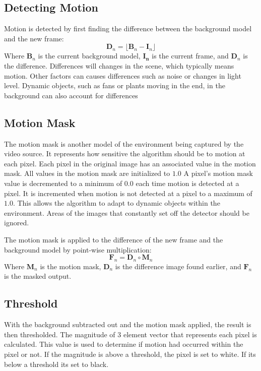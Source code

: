 \documentclass[journal]{IEEEtran}
\begin{document}
\subsection{Detecting Motion}
Motion is detected by first finding the difference between the background model and the new frame:
$$
\mathbf{D}_n = \lfloor\mathbf{B}_n - \mathbf{I}_n\rfloor
$$
Where $\mathbf{B}_n$ is the current background model, $\mathbf{I_n}$ is the current frame, and $\mathbf{D}_n$ 
is the difference. Differences will changes in the scene, which typically means motion. Other factors can causes 
differences such as noise or changes in light level. Dynamic objects, such as fans or plants moving in the end, 
in the background can also  account for differences

\subsection{Motion Mask}
The motion mask is another model of the environment being captured by the video source. It represents how
sensitive the algorithm should be to motion at each pixel. Each pixel in the original image has an associated 
value in the motion mask. All values in the motion mask are initialized to $1.0$ A pixel's motion mask
value is decremented to a minimum of $0.0$ each time motion is detected at a pixel. It is incremented when
motion is not detected at a pixel to a maximum of $1.0$. This allows the algorithm to adapt to dynamic
objects within the environment. Areas of the images that constantly set off the detector should be ignored.

The motion mask is applied to the difference of the new frame and the background model by point-wise multiplication:
$$
\mathbf{F}_n = \mathbf{D}_n \circ \mathbf{M}_n 
$$
Where $\mathbf{M}_n$ is the motion mask, $\mathbf{D}_n$ is the difference image found earlier, and $\mathbf{F}_n$ is the masked output.

\subsection{Threshold}
With the background subtracted out and the motion mask applied, the result is then thresholded. The magnitude
of 3 element vector that represents each pixel is calculated. This value is used to determine if motion
had occurred within the pixel or not. If the magnitude is above a threshold, the pixel is
set to white. If its below a threshold its set to black.
\end{document}
